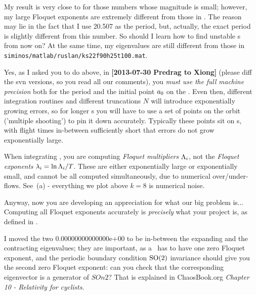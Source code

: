 \begin{description}
My result is very close to   for those numbers whose
magnitude is small; however, my large Floquet exponents are extremely different from those
in . The reason may lie in the fact that I use 20.507 as
the period, but, actually, the exact period is slightly different from this number. So
should I learn how to find unstable \po s from now on?
At the same time, my eigenvalues are still
different from those in \\
\texttt{siminos/matlab/ruslan/ks22f90h25t100.mat}.

\item[2013-08-02 Predrag to Xiong] Yes, as I asked you to do above, in
    {\bf [2013-07-30 Predrag to Xiong]} (please diff the svn versions,
    so you read all our comments), you \emph{must use the full machine
    precision} both for the period \period{} and the initial point
    ${a_0}$ on the \po. Even then, different integration routines and
    different truncations $N$ will introduce exponentially growing
    errors, so for longer \po s you will have to use a set of points on
    the orbit ('multiple shooting') to pin it down accurately.
    Typically these points sit on {\PoincSec s}, with flight times
    in-between sufficiently short that errors do not grow exponentially
    large.

\item[2013-08-02 Predrag to Xiong] When integrating ,
you are computing \emph{Floquet multipliers} $\Lambda_i$,
not the \emph{Floquet exponents} $\lambda_i=\ln \Lambda_i /{T_{}}$.
These are either exponentially large or exponentially small, and cannot
be all computed simultaneously, due to numerical over/under-flows. See
\,(a) - everything we plot above $k=8$ is numerical
noise.

Anyway, now you are developing an appreciation for what our big problem
is... Computing all Floquet exponents accurately is \emph{precisely} what
your project is, as defined in .

\item[2013-08-02 Predrag to Xiong] I moved the two
0.00000000000000e+00 to be in-between the expanding and the contracting
eigenvalues; they are important, as a \po\ has to have one zero
Floquet exponent, and the periodic boundary condition $\textrm{SO}(2)$
invariance should give you the second zero Floquet exponent: can you
check that the corresponding eigenvector is a generator of $SOn{2}$? That
is explained in ChaosBook.org {\em Chapter 10 - Relativity for cyclists}.


\end{description}
